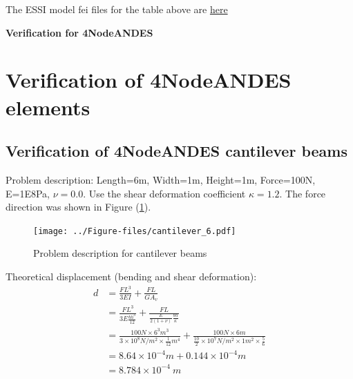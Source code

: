 \documentclass[fleqn,11pt]{article}
\begin{document}
The ESSI model fei files for the table above are \href{https://github.com/yuan-energy/ESSI_Verification/blob/master/27NodeBrick/circular_plate_simply_support/circular_plate_simply_support.tar.gz?raw=true}{here}


























\newpage
\begin{center}
  \Large\textbf{Verification for 4NodeANDES}
\end{center}


\vskip 24pt

\section{Verification of 4NodeANDES elements}
\subsection{Verification of 4NodeANDES cantilever beams}





Problem description: Length=6m, Width=1m, Height=1m, Force=100N, E=1E8Pa, $\nu=0.0$. Use the shear deformation coefficient $\kappa=1.2$. The force direction was shown in Figure (\ref{fig Problem description for cantilever 4}). 

\begin{figure}[H]
  \centering
  \texttt{[image: ../Figure-files/cantilever\_6.pdf]}
  \caption{Problem description for cantilever beams}
  \label{fig Problem description for cantilever 4}
\end{figure}


Theoretical displacement (bending and shear deformation):
\begin{equation}
  \begin{aligned}
  d &=\frac{FL^3}{3EI}+\frac{FL}{GA_v} \\
  &= \frac{FL^3}{3E\frac{bh^3}{12}}+\frac{FL}{\frac{E}{2(1+\nu)} \frac{bh}{\kappa}} \\ 
    &= \frac{100 N \times 6^3 m^3}{3\times 10^8 N/m^2 \times \frac{1}{12} m^4}+ 
    \frac{100 N\times 6 m}{\frac{10}{2} \times 10^7 N/m^2\times 1 m^2 \times \frac{5}{6}} \\ 
    &=8.64\times 10^{-4} m + 0.144 \times 10^{-4} m   \\
   & =8.784\times 10^{-4} \ m
   \end{aligned}
\end{equation}
\end{document}
